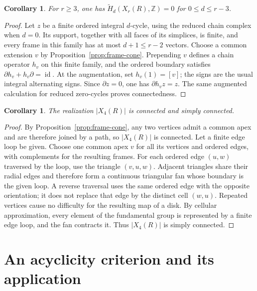 \documentclass[10pt,a4paper]{amsart}
\newcommand{\Z}{\mathbb Z}
\DeclareMathOperator{\id}{id}
\newtheorem{corollary}[theorem]{Corollary}
\numberwithin{equation}{section}
\begin{document}
\begin{corollary}\label{cor:frame-homology}
For $r\geq3$, one has $\widetilde H_d(X_r(R),\Z)=0$ for $0\leq d\leq r-3$.
\end{corollary}

\begin{proof}
Let $z$ be a finite ordered integral $d$-cycle, using the reduced chain complex when $d=0$. Its support, together with all faces of its simplices, is finite, and every frame in this family has at most $d+1\leq r-2$ vectors. Choose a common extension $v$ by Proposition~\ref{prop:frame-cone}. Prepending $v$ defines a chain operator $h_v$ on this finite family, and the ordered boundary satisfies $\partial h_v+h_v\partial=\id$. At the augmentation, set $h_v(1)=[v]$; the signs are the usual integral alternating signs. Since $\partial z=0$, one has $\partial h_vz=z$. The same augmented calculation for reduced zero-cycles proves connectedness.
\end{proof}

\begin{corollary}\label{cor:frame-simple-connectivity}
The realization $|X_4(R)|$ is connected and simply connected.
\end{corollary}

\begin{proof}
By Proposition~\ref{prop:frame-cone}, any two vertices admit a common apex and are therefore joined by a path, so $|X_4(R)|$ is connected. Let a finite edge loop be given. Choose one common apex $v$ for all its vertices and ordered edges, with complements for the resulting frames. For each ordered edge $(u,w)$ traversed by the loop, use the triangle $(v,u,w)$. Adjacent triangles share their radial edges and therefore form a continuous triangular fan whose boundary is the given loop. A reverse traversal uses the same ordered edge with the opposite orientation; it does not replace that edge by the distinct cell $(w,u)$. Repeated vertices cause no difficulty for the resulting map of a disk. By cellular approximation, every element of the fundamental group is represented by a finite edge loop, and the fan contracts it. Thus $|X_4(R)|$ is simply connected.
\end{proof}

\section{An acyclicity criterion and its application}
\label{sec:acyclicity-criterion}
\end{document}
